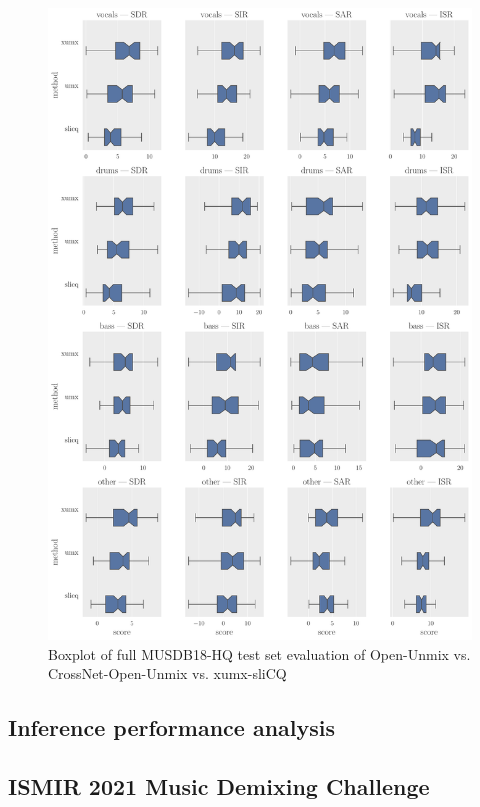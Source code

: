 \documentclass[report.tex]{subfiles}
\begin{document}
\begin{figure}[ht]
	\centering
	\includegraphics[width=\textwidth]{./images-bss/boxplot_full.png}
	\caption{Boxplot of full MUSDB18-HQ test set evaluation of Open-Unmix vs. CrossNet-Open-Unmix vs. xumx-sliCQ}
	\label{fig:bssboxplot}
\end{figure}

\subsection{Inference performance analysis}

\subsection{ISMIR 2021 Music Demixing Challenge}

\end{document}

